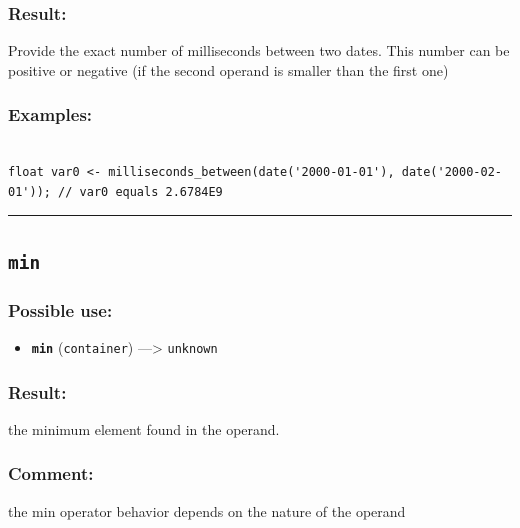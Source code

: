 \documentclass[]{book}
\providecommand{\tightlist}{%
  \setlength{\itemsep}{0pt}\setlength{\parskip}{0pt}}
\theoremstyle{definition}
\theoremstyle{definition}
\theoremstyle{definition}
\theoremstyle{remark}
\begin{document}
\subsubsection{Result:}\label{result-339}

Provide the exact number of milliseconds between two dates. This number
can be positive or negative (if the second operand is smaller than the
first one)

\subsubsection{Examples:}\label{examples-241}

\begin{verbatim}
 
float var0 <- milliseconds_between(date('2000-01-01'), date('2000-02-01')); // var0 equals 2.6784E9
\end{verbatim}

\begin{center}\rule{0.5\linewidth}{\linethickness}\end{center}

\subsection{\texorpdfstring{\texttt{min}}{min}}\label{min}

\subsubsection{Possible use:}\label{possible-use-351}

\begin{itemize}
\tightlist
\item
  \textbf{\texttt{min}} (\texttt{container}) ---\textgreater{}
  \texttt{unknown}
\end{itemize}

\subsubsection{Result:}\label{result-340}

the minimum element found in the operand.

\subsubsection{Comment:}\label{comment-70}

the min operator behavior depends on the nature of the operand
\end{document}
